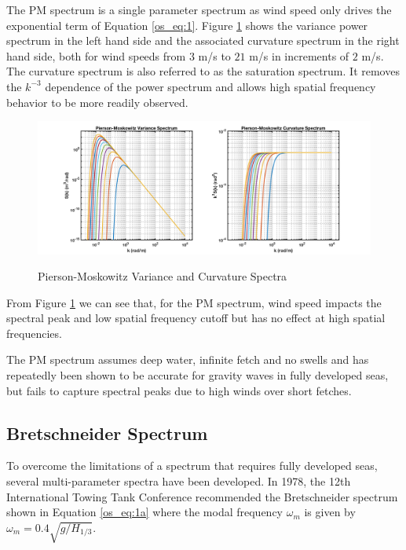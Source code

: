 The PM spectrum is a single parameter spectrum as wind speed only drives the exponential term of Equation \ref{os_eq:1}. Figure \ref{os_fig:1} shows the variance power spectrum in the left hand side and the associated curvature spectrum in the right hand side, both for wind speeds from $3$ m/s to $21$ m/s in increments of $2$ m/s. The curvature spectrum is also referred to as the saturation spectrum. It removes the $k^{-3}$ dependence of the power spectrum and allows high spatial frequency behavior to be more readily observed.
 
 \begin{figure}[ht]
  \begin{center}
\includegraphics[width=6in]{../media/Ocean_Surface/PM_variance_curvature_spectrum.png}
  \end{center}
  \renewcommand{\baselinestretch}{1} \small\normalsize
  \begin{quote}
    \caption[Pierson-Moskowitz Variance and Curvature Spectra]{Pierson-Moskowitz Variance and Curvature Spectra\label{os_fig:1}}
  \end{quote}
\end{figure}
 \renewcommand{\baselinestretch}{2} \small\normalsize
 
From Figure \ref{os_fig:1} we can see that, for the PM spectrum, wind speed impacts the spectral peak and low spatial frequency cutoff but has no effect at high spatial frequencies.
 
The PM spectrum assumes deep water, infinite fetch and no swells and has repeatedly been shown to be accurate for gravity waves in fully developed seas, but fails to capture spectral peaks due to high winds over short fetches.

\subsection {Bretschneider Spectrum}
To overcome the limitations of a spectrum that requires fully developed seas, several multi-parameter spectra have been developed. In 1978, the 12th International Towing Tank Conference recommended the Bretschneider spectrum \cite{michel_sea_spectra} shown in Equation \ref{os_eq:1a} where the modal frequency $\omega_m$ is given by $\omega_m = 0.4\sqrt{g/H_{1/3}}$.

